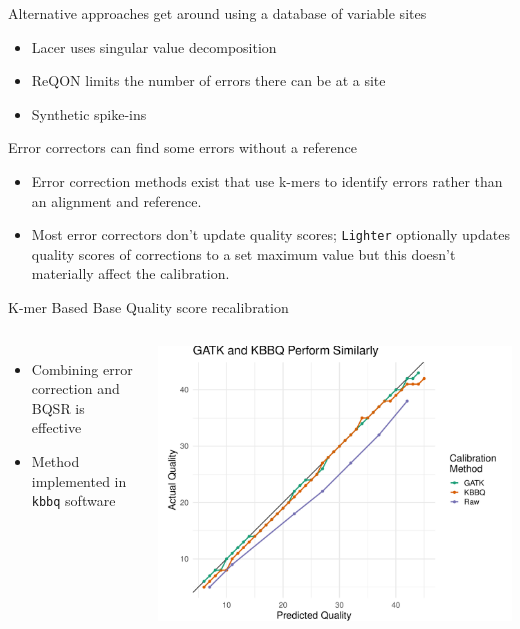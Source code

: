 \documentclass{beamer}
\begin{document}
\begin{frame}{Alternative approaches get around using a database of variable sites}
\begin{itemize}
	\item Lacer uses singular value decomposition
	\item ReQON limits the number of errors there can be at a site
	\item Synthetic spike-ins
\end{itemize}
\end{frame}

\begin{frame}{Error correctors can find some errors without a reference}
\begin{itemize}
\item Error correction methods exist that use k-mers to identify errors rather than an alignment and reference.
\item Most error correctors don't update quality scores; \texttt{Lighter} optionally updates quality scores of corrections to a set maximum value but this doesn't materially affect the calibration.
\end{itemize}

\end{frame}

\begin{frame}{K-mer Based Base Quality score recalibration}
\begin{columns}
\begin{itemize}
\item Combining error correction and BQSR is effective
\item Method implemented in \texttt{kbbq} software
\end{itemize}
\includegraphics[width=.95\linewidth]{comparison.pdf}
\end{columns}
\end{frame}
\end{document}
